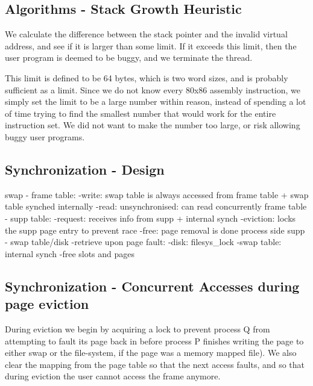 \subsection{Algorithms - Stack Growth Heuristic}


We calculate the difference between the stack pointer and the invalid virtual
address, and see if it is larger than some limit. If it exceeds this limit, then
the user program is deemed to be buggy, and we terminate the thread.

This limit is defined to be 64 bytes, which is two word sizes, and is probably
sufficient as a limit.  Since we do not know every 80x86 assembly instruction,
we simply set the limit to be a large number within reason, instead of spending
a lot of time trying to find the smallest number that would work for the entire
instruction set. We did not want to make the number too large, or risk allowing
buggy user programs.

\subsection{Synchronization - Design}

swap - frame table:
  -write: swap table is always accessed from frame table + swap table synched internally
  -read: unsynchronised: can read concurrently %
frame table - supp table:
  -request: receives info from supp + internal synch
  -eviction: locks the supp page entry to prevent race
  -free: page removal is done process side
supp - swap table/disk
  -retrieve upon page fault:
    -disk: filesys\_lock
    -swap table: internal synch
  -free slots and pages

\subsection{Synchronization - Concurrent Accesses during page eviction}

During eviction we begin by acquiring a lock to prevent process Q from attempting to fault its page back in before process P finishes writing the page to either swap or the file-system, if the page was a memory mapped file). We also clear the mapping from the page table so that the next access faults, and so that during eviction the user cannot access the frame anymore.

